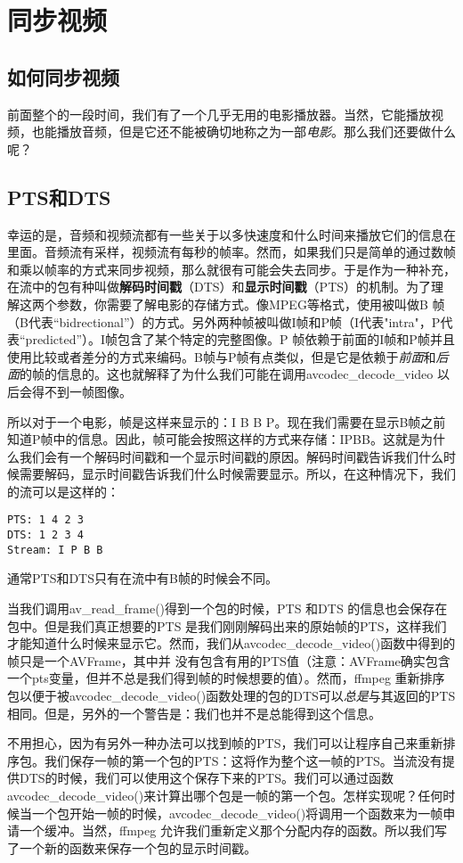 ﻿\chapter{同步视频}
\label{ch5}
\section{如何同步视频}
前面整个的一段时间，我们有了一个几乎无用的电影播放器。当然，它能播放视频，也能播放音频，但是它还不能被确切地称之为一部\emph{电影}。那么我们还要做什么呢？
\section{PTS和DTS}
幸运的是，音频和视频流都有一些关于以多快速度和什么时间来播放它们的信息在里面。音频流有采样，视频流有每秒的帧率。然而，如果我们只是简单的通过数帧和乘以帧率的方式来同步视频，那么就很有可能会失去同步。于是作为一种补充，在流中的包有种叫做\textbf{解码时间戳}（DTS）和\textbf{显示时间戳}（PTS）的机制。为了理解这两个参数，你需要了解电影的存储方式。像MPEG等格式，使用被叫做B 帧（B代表“bidrectional”）的方式。另外两种帧被叫做I帧和P帧（I代表"intra"，P代表“predicted”）。I帧包含了某个特定的完整图像。P 帧依赖于前面的I帧和P帧并且使用比较或者差分的方式来编码。B帧与P帧有点类似，但是它是依赖于\emph{前面}和\emph{后面}的帧的信息的。这也就解释了为什么我们可能在调用avcodec_decode_video 以后会得不到一帧图像。

所以对于一个电影，帧是这样来显示的：I B B P。现在我们需要在显示B帧之前知道P帧中的信息。因此，帧可能会按照这样的方式来存储：IPBB。这就是为什么我们会有一个解码时间戳和一个显示时间戳的原因。解码时间戳告诉我们什么时候需要解码，显示时间戳告诉我们什么时候需要显示。所以，在这种情况下，我们的流可以是这样的：

\begin{verbatim}
PTS: 1 4 2 3
DTS: 1 2 3 4
Stream: I P B B
\end{verbatim}

通常PTS和DTS只有在流中有B帧的时候会不同。

当我们调用av_read_frame()得到一个包的时候，PTS 和DTS 的信息也会保存在包中。但是我们真正想要的PTS 是我们刚刚解码出来的原始帧的PTS，这样我们才能知道什么时候来显示它。然而，我们从avcodec_decode_video()函数中得到的帧只是一个AVFrame，其中并 没有包含有用的PTS值（注意：AVFrame确实包含一个pts变量，但并不总是我们得到帧的时候想要的值）。然而，ffmpeg 重新排序包以便于被avcodec_decode_video()函数处理的包的DTS可以\emph{总是}与其返回的PTS相同。但是，另外的一个警告是：我们也并不是总能得到这个信息。

不用担心，因为有另外一种办法可以找到帧的PTS，我们可以让程序自己来重新排序包。我们保存一帧的第一个包的PTS：这将作为整个这一帧的PTS。当流没有提供DTS的时候，我们可以使用这个保存下来的PTS。我们可以通过函数avcodec_decode_video()来计算出哪个包是一帧的第一个包。怎样实现呢？任何时候当一个包开始一帧的时候，avcodec_decode_video()将调用一个函数来为一帧申请一个缓冲。当然，ffmpeg 允许我们重新定义那个分配内存的函数。所以我们写了一个新的函数来保存一个包的显示时间戳。

